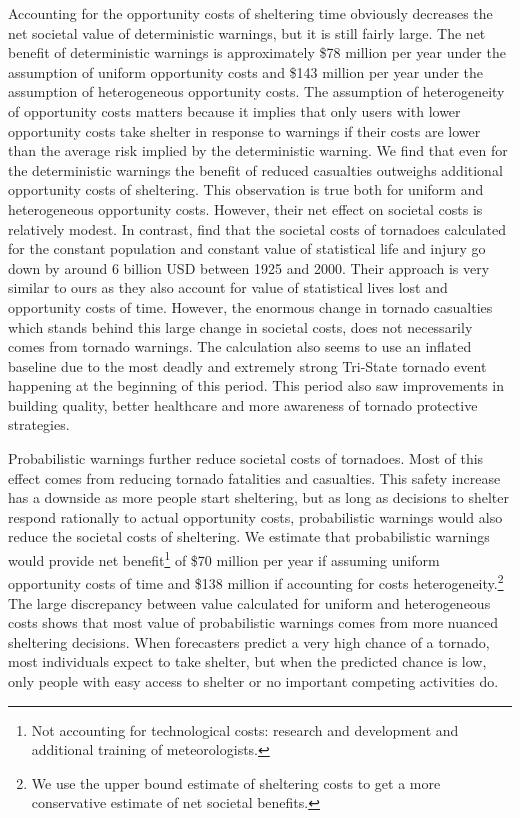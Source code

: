 \documentclass{ametsocV6.1}
\begin{document}
Accounting for the opportunity costs of sheltering time obviously decreases the net societal value of deterministic warnings, but it is still fairly large. The net benefit of deterministic warnings is approximately \$78 million per year under the assumption of uniform opportunity costs and \$143 million per year under the assumption of heterogeneous opportunity costs. The assumption of heterogeneity of opportunity costs matters because it implies that only users with lower opportunity costs take shelter in response to warnings if their costs are lower than the average risk implied by the deterministic warning. We find that even for the deterministic warnings the benefit of reduced casualties outweighs additional opportunity costs of sheltering. This observation is true both for uniform and heterogeneous opportunity costs. However, their net effect on societal costs is relatively modest.  In contrast, \citet{simmons_economic_2013} find that the societal costs of tornadoes calculated for the constant population and constant value of statistical life and injury go down by around 6 billion USD between 1925 and 2000. Their approach is very similar to ours as they also account for value of statistical lives lost and opportunity costs of time. However, the enormous change in tornado casualties which stands behind this large change in societal costs, does not necessarily comes from tornado warnings. The calculation also seems to use an inflated baseline due to the most deadly and extremely strong Tri-State tornado event happening at the beginning of this period. This period also saw improvements in building quality, better healthcare and more awareness of tornado protective strategies.

Probabilistic warnings further reduce societal costs of tornadoes. Most of this effect comes from reducing tornado fatalities and casualties. This safety increase has a downside as more people start sheltering, but as long as decisions to shelter respond rationally to actual opportunity costs, probabilistic warnings would also reduce the societal costs of sheltering. We estimate that probabilistic warnings would provide net benefit\footnote{Not accounting for technological costs: research and development and additional training of meteorologists.} of \$70 million per year if assuming uniform opportunity costs of time and \$138 million if accounting for costs heterogeneity.\footnote{We use the upper bound estimate of sheltering costs to get a more conservative estimate of net societal benefits.} The large discrepancy between value calculated for uniform and heterogeneous costs shows that most value of probabilistic warnings comes from more nuanced sheltering decisions. When forecasters predict a very high chance of a tornado, most individuals expect to take shelter, but when the predicted chance is low, only people with easy access to shelter or no important competing activities do. 
\end{document}
